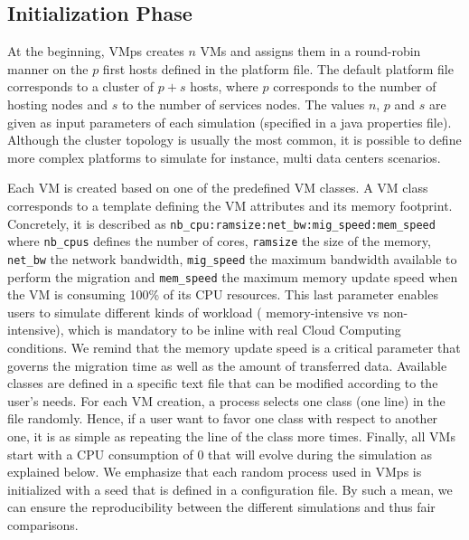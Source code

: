 \documentclass[conference]{IEEEtran}
\newcommand{\vmps}{VMps\xspace}
\begin{document}
\subsection{Initialization Phase}
At the beginning, \vmps creates $n$ VMs and assigns them in a
round-robin manner on the $p$ first hosts defined in the platform file.
The default platform file corresponds to a cluster of $p+s$ hosts,
where $p$ corresponds to the number of hosting nodes and $s$ to the
number of services nodes. The values $n$, $p$ and $s$ are given as input
parameters of each simulation (specified in a java properties file).
 Although the cluster topology is usually the
most common, it is possible to define more complex platforms to simulate for
instance, multi data centers scenarios.

Each VM is created based on one of the predefined VM classes. A VM
class corresponds to a template defining the VM attributes and its
memory footprint. Concretely, it is described as
\texttt{nb\_cpu:ramsize:net\_bw:mig\_speed:mem\_speed} where
\texttt{nb\_cpus} defines the number of cores, \texttt{ramsize} the
size of the memory, \texttt{net\_bw} the network bandwidth,
\texttt{mig\_speed} the maximum bandwidth available to perform the
migration and \texttt{mem\_speed} the maximum memory update speed when
the VM is consuming 100\% of its CPU resources. This last parameter
enables users to simulate different kinds of workload (\ie
memory-intensive vs non-intensive), which is mandatory to be inline
with real Cloud Computing conditions. We remind that the memory update
speed is a critical parameter that governs the migration time as well
as the amount of transferred data. Available classes are defined in a
specific text file that can be modified according to the user's needs.
For each VM creation, a process selects one class (\ie one line) in
the file randomly. Hence, if a user want to favor one class with
respect to another one, it is as simple as repeating the line of the
class more times. Finally, all VMs start with a CPU consumption of 0
that will evolve during the simulation as explained below.
We emphasize that each random process used in \vmps is initialized with a seed
that is defined in a configuration file. By such a mean, we can ensure
the reproducibility between the different simulations and thus fair
comparisons.
\end{document}
